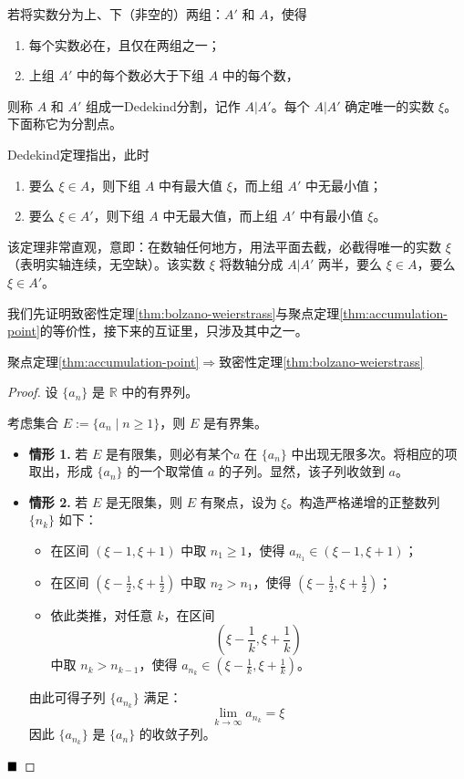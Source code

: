 \begin{theorem}[Dedekind分割定理]
若将实数分为上、下（非空的）两组：\(A'\) 和 \(A\)，使得
\begin{enumerate}
    \item 每个实数必在，且仅在两组之一；
    \item 上组 \(A'\) 中的每个数必大于下组 \(A\) 中的每个数，
\end{enumerate}
则称 \(A\) 和 \(A'\) 组成一Dedekind分割，记作 \(A|A'\)。每个 \(A|A'\) 确定唯一的实数 \(\xi\)。下面称它为分割点。

Dedekind定理指出，此时
\begin{enumerate}
    \item 要么 \(\xi \in A\)，则下组 \(A\) 中有最大值 \(\xi\)，而上组 \(A'\) 中无最小值；
    \item 要么 \(\xi \in A'\)，则下组 \(A\) 中无最大值，而上组 \(A'\) 中有最小值 \(\xi\)。
\end{enumerate}
该定理非常直观，意即：在数轴任何地方，用法平面去截，必截得唯一的实数 \(\xi\)（表明实轴连续，无空缺）。该实数 \(\xi\) 将数轴分成 \(A|A'\) 两半，要么 \(\xi \in A\)，要么 \(\xi \in A'\)。
\end{theorem}

我们先证明致密性定理\ref{thm:bolzano-weierstrass}与聚点定理\ref{thm:accumulation-point}的等价性，接下来的互证里，只涉及其中之一。

聚点定理\ref{thm:accumulation-point}$\Rightarrow$致密性定理\ref{thm:bolzano-weierstrass}
\begin{proof}
    设 $\{a_n\}$ 是 $\mathbb{R}$ 中的有界列。
    
    考虑集合 $E := \{a_n \mid n \geq 1\}$，则 $E$ 是有界集。
    
    \begin{itemize}
        \item \textbf{情形 1.} 若 $E$ 是有限集，则必有某个$a$ 在 $\{a_n\}$ 中出现无限多次。将相应的项取出，形成 $\{a_n\}$ 的一个取常值 $a$ 的子列。显然，该子列收敛到 $a$。
        
        \item \textbf{情形 2.} 若 $E$ 是无限集，则 $E$ 有聚点，设为 $\xi$。构造严格递增的正整数列 $\{n_k\}$ 如下：
        \begin{itemize}
            \item 在区间 $(\xi - 1, \xi + 1)$ 中取 $n_1 \geq 1$，使得 $a_{n_1} \in (\xi - 1, \xi + 1)$；
            \item 在区间 $(\xi - \frac{1}{2}, \xi + \frac{1}{2})$ 中取 $n_2 > n_1$，使得 $(\xi - \frac{1}{2}, \xi + \frac{1}{2})$；
            \item 依此类推，对任意 $k$，在区间
            $$ \left( \xi - \frac{1}{k}, \xi + \frac{1}{k} \right) $$
            中取 $n_k > n_{k-1}$，使得 $a_{n_k} \in \left( \xi - \frac{1}{k}, \xi + \frac{1}{k} \right)$。
        \end{itemize}
        由此可得子列 $\{a_{n_k}\}$ 满足：
        $$ \lim_{k \to \infty} a_{n_k} = \xi $$
        因此 $\{a_{n_k}\}$ 是 $\{a_n\}$ 的收敛子列。
    \end{itemize}
    $\hfill \blacksquare$
    \end{proof}

